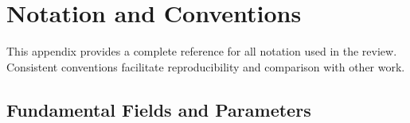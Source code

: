 
\section{Notation and Conventions}\label{app:notation}

This appendix provides a complete reference for all notation used in the review.
Consistent conventions facilitate reproducibility and comparison with other work.

\subsection{Fundamental Fields and Parameters}\label{app:fields}

